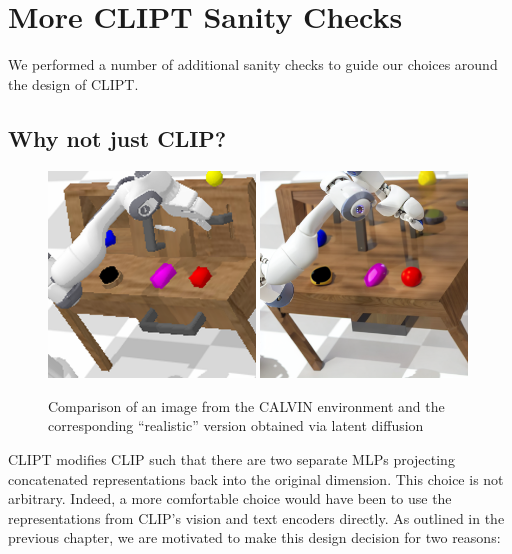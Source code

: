 \documentclass[../main.tex]{subfiles}
\begin{document}
\chapter{More CLIPT Sanity Checks}\label{app:clipt-sanity}

We performed a number of additional  sanity checks to guide our choices around the design of CLIPT.

\section{Why not just CLIP?}

\begin{figure}[t]
	\centering
	\includegraphics[width=0.49\textwidth]{figures/clip_ood/calvin_env_original}
	\includegraphics[width=0.49\textwidth]{figures/clip_ood/calvin_env_realistic}
	\caption[Original and "Realistic" CALVIN state]{Comparison of an image from the CALVIN environment and the corresponding ``realistic''
		version obtained via latent diffusion}
	\label{fig:sd-realistic}
\end{figure}

CLIPT modifies CLIP such that there are two separate MLPs projecting concatenated representations
back into the original dimension. This choice is not arbitrary. Indeed, a more comfortable choice
would have been to use the representations from CLIP's vision and text encoders directly. As
outlined in the previous chapter, we are motivated to make this design decision for two reasons:
\end{document}
